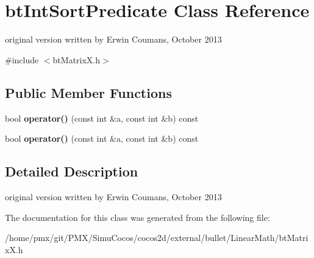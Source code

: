 \hypertarget{classbtIntSortPredicate}{}\section{bt\+Int\+Sort\+Predicate Class Reference}
\label{classbtIntSortPredicate}


original version written by Erwin Coumans, October 2013  




{\ttfamily \#include $<$bt\+Matrix\+X.\+h$>$}

\subsection*{Public Member Functions}
\begin{DoxyCompactItemize}
\item 
\mbox{\label{classbtIntSortPredicate_a57e25ed33ad0245c4cb6e1a2eae19291}} 
bool {\bfseries operator()} (const int \&a, const int \&b) const
\item 
\mbox{\label{classbtIntSortPredicate_a57e25ed33ad0245c4cb6e1a2eae19291}} 
bool {\bfseries operator()} (const int \&a, const int \&b) const
\end{DoxyCompactItemize}


\subsection{Detailed Description}
original version written by Erwin Coumans, October 2013 

The documentation for this class was generated from the following file\+:\begin{DoxyCompactItemize}
\item 
/home/pmx/git/\+P\+M\+X/\+Simu\+Cocos/cocos2d/external/bullet/\+Linear\+Math/bt\+Matrix\+X.\+h\end{DoxyCompactItemize}
